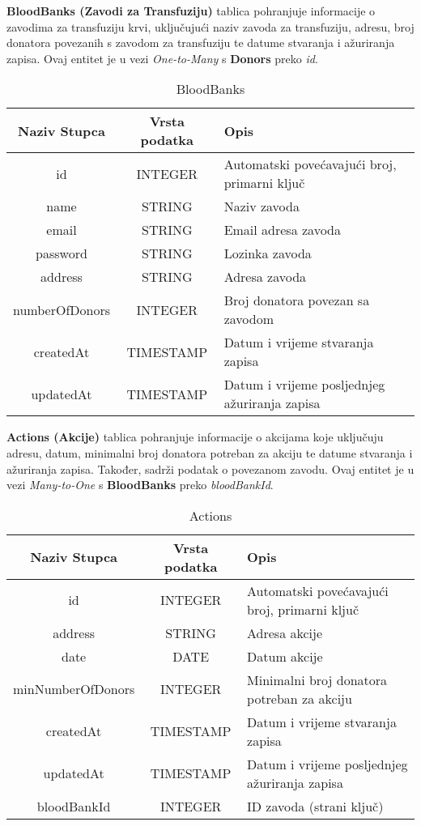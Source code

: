 \documentclass[12pt]{article}
\begin{document}
\noindent\textbf{BloodBanks (Zavodi za Transfuziju)} tablica pohranjuje informacije o zavodima za transfuziju krvi, uključujući naziv zavoda za transfuziju, adresu, broj donatora povezanih s zavodom za transfuziju te datume stvaranja i ažuriranja zapisa. Ovaj entitet je u vezi \textit{One-to-Many} s \textbf{Donors} preko \textit{id}.
\begin{table}[H]
    \renewcommand{\arraystretch}{2}
    \centering
     \begin{tabularx}{1\textwidth}{|c|c|X|}
    \hline
    \textbf{Naziv Stupca} & \textbf{Vrsta podatka} & \textbf{Opis} \\
    \hline
    id & INTEGER & Automatski povećavajući broj, primarni ključ\\
    \hline
    name & STRING & Naziv zavoda \\
    \hline
    email & STRING & Email adresa zavoda \\
    \hline
    password & STRING & Lozinka zavoda \\
    \hline
    address & STRING & Adresa zavoda \\
    \hline
    numberOfDonors & INTEGER & Broj donatora povezan sa zavodom \\
    \hline
    createdAt & TIMESTAMP & Datum i vrijeme stvaranja zapisa \\
    \hline
    updatedAt & TIMESTAMP & Datum i vrijeme posljednjeg ažuriranja zapisa \\
    \hline
    \end{tabularx}
    \caption{BloodBanks}
    \label{tab:my_label}
\end{table}
\clearpage %

\noindent\textbf{Actions (Akcije)} tablica pohranjuje informacije o akcijama koje uključuju adresu, datum, minimalni broj donatora potreban za akciju te datume stvaranja i ažuriranja zapisa. Također, sadrži podatak o povezanom zavodu. Ovaj entitet je u vezi \textit{Many-to-One} s \textbf{BloodBanks} preko \textit{bloodBankId}.
\begin{table}[H]
    \renewcommand{\arraystretch}{2}
    \centering
     \begin{tabularx}{1\textwidth}{|c|c|X|}
    \hline
    \textbf{Naziv Stupca} & \textbf{Vrsta podatka} & \textbf{Opis} \\
    \hline
    id & INTEGER & Automatski povećavajući broj, primarni ključ\\
    \hline
    address & STRING & Adresa akcije \\
    \hline
    date & DATE & Datum akcije \\
    \hline
    minNumberOfDonors & INTEGER & Minimalni broj donatora potreban za akciju \\
    \hline
    createdAt & TIMESTAMP & Datum i vrijeme stvaranja zapisa \\
    \hline
    updatedAt & TIMESTAMP & Datum i vrijeme posljednjeg ažuriranja zapisa \\
    \hline
    bloodBankId & INTEGER & ID zavoda (strani ključ) \\
    \hline
    \end{tabularx}
    \caption{Actions}
    \label{tab:my_label}
\end{table}
\clearpage %
\end{document}
